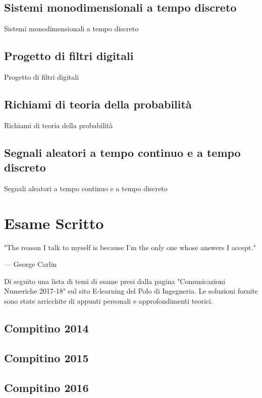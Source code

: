 \documentclass[12pt,oneside,openany]{memoir}
\numberwithin{equation}{subsection}
\begin{document}
\newpage
\section{Sistemi monodimensionali a tempo discreto}
Sistemi monodimensionali a tempo discreto

\newpage
\section{Progetto di filtri digitali}
Progetto di filtri digitali

\newpage
\section{Richiami di teoria della probabilit\`a}
Richiami di teoria della probabilit\`a

\newpage
\section{Segnali aleatori a tempo continuo e a tempo discreto}
Segnali aleatori a tempo continuo e a tempo discreto


\chapter{Esame Scritto}
\epigraph{"The reason I talk to myself is because I'm the only one whose answers I accept."}{--- \textup{George Carlin}}

Di seguito una lista di temi di esame presi dalla pagina "Comunicazioni Numeriche 2017-18" sul sito E-learning del Polo di Ingegneria. Le soluzioni fornite sono state arricchite di appunti personali e approfondimenti teorici.

\newpage
\section{Compitino 2014}

\newpage
\section{Compitino 2015}

\newpage
\section{Compitino 2016}
\end{document}
